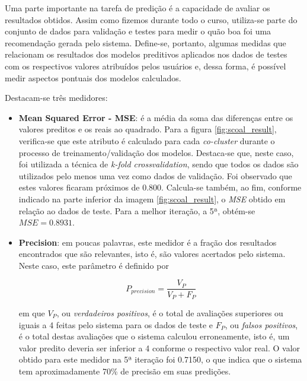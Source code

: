 Uma parte importante na tarefa de predição é a capacidade de avaliar os
resultados obtidos. Assim como fizemos durante todo o curso, utiliza-se parte do
conjunto de dados para validação e testes para medir o quão boa foi uma
recomendação gerada pelo sistema. Define-se, portanto, algumas medidas que
relacionam os resultados dos modelos preditivos aplicados nos dados de testes
com os respectivos valores atribuídos pelos usuários e, dessa forma, é possível
medir aspectos pontuais dos modelos calculados.

\vspace{12pt}

Destacam-se três medidores:

\begin{itemize}
  \item \textbf{Mean Squared Error - MSE}: é a média da soma das diferenças
  entre os valores preditos e os reais ao quadrado. Para a figura
  \ref{fig:scoal_result},  verifica-se que este atributo é calculado para cada
  \textit{co-cluster} durante o processo de treinamento/validação dos modelos.
  Destaca-se que, neste caso, foi utilizada a técnica de \textit{k-fold
  crossvalidation}, sendo que todos os dados são utilizados pelo menos uma vez
  como dados de validação. Foi observado que estes valores ficaram próximos de
  0.800. Calcula-se também, ao fim, conforme indicado na parte inferior da
  imagem \ref{fig:scoal_result}, o \textit{MSE} obtido em relação ao dados de teste.
  Para a melhor iteração, a 5ª, obtém-se \(MSE = 0.8931\).
 
  \item \textbf{Precision}: em poucas palavras, este medidor é a fração dos
  resultados encontrados que são relevantes, isto é, são valores acertados pelo
  sistema. Neste caso, este parâmetro é definido por
 
  \begin{equation}
  P_{precision} = \frac{V_P}{V_P + F_P}
  \end{equation}
 
 
  em que \(V_P\), ou \textit{verdadeiros positivos}, é o total de avaliações
  superiores ou iguais a 4 feitas pelo sistema para os dados de teste e
  \(F_P\), ou \textit{falsos positivos}, é o total destas avaliações que o
  sistema calculou erroneamente, isto é, um valor predito deveria ser inferior
  a 4 conforme o respectivo  valor real. O valor obtido para este medidor na 5ª
  iteração foi 0.7150, o que indica que o sistema tem aproximadamente 70\% de
  precisão em suas predições.
 

\end{itemize}
